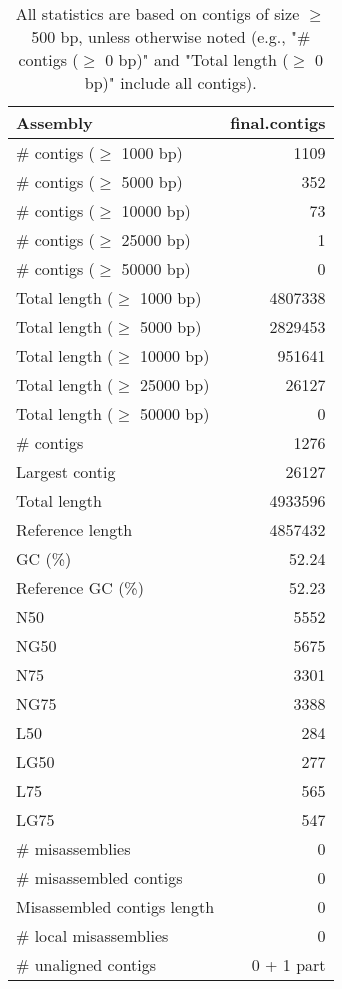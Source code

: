 \documentclass[12pt,a4paper]{article}
\begin{document}
\begin{table}[ht]
\begin{center}
\caption{All statistics are based on contigs of size $\geq$ 500 bp, unless otherwise noted (e.g., "\# contigs ($\geq$ 0 bp)" and "Total length ($\geq$ 0 bp)" include all contigs).}
\begin{tabular}{|l*{1}{|r}|}
\hline
Assembly & final.contigs \\ \hline
\# contigs ($\geq$ 1000 bp) & 1109 \\ \hline
\# contigs ($\geq$ 5000 bp) & 352 \\ \hline
\# contigs ($\geq$ 10000 bp) & 73 \\ \hline
\# contigs ($\geq$ 25000 bp) & 1 \\ \hline
\# contigs ($\geq$ 50000 bp) & 0 \\ \hline
Total length ($\geq$ 1000 bp) & 4807338 \\ \hline
Total length ($\geq$ 5000 bp) & 2829453 \\ \hline
Total length ($\geq$ 10000 bp) & 951641 \\ \hline
Total length ($\geq$ 25000 bp) & 26127 \\ \hline
Total length ($\geq$ 50000 bp) & 0 \\ \hline
\# contigs & 1276 \\ \hline
Largest contig & 26127 \\ \hline
Total length & 4933596 \\ \hline
Reference length & 4857432 \\ \hline
GC (\%) & 52.24 \\ \hline
Reference GC (\%) & 52.23 \\ \hline
N50 & 5552 \\ \hline
NG50 & 5675 \\ \hline
N75 & 3301 \\ \hline
NG75 & 3388 \\ \hline
L50 & 284 \\ \hline
LG50 & 277 \\ \hline
L75 & 565 \\ \hline
LG75 & 547 \\ \hline
\# misassemblies & 0 \\ \hline
\# misassembled contigs & 0 \\ \hline
Misassembled contigs length & 0 \\ \hline
\# local misassemblies & 0 \\ \hline
\# unaligned contigs & 0 + 1 part \\ \hline

\end{tabular}
\end{center}
\end{table}
\end{document}
